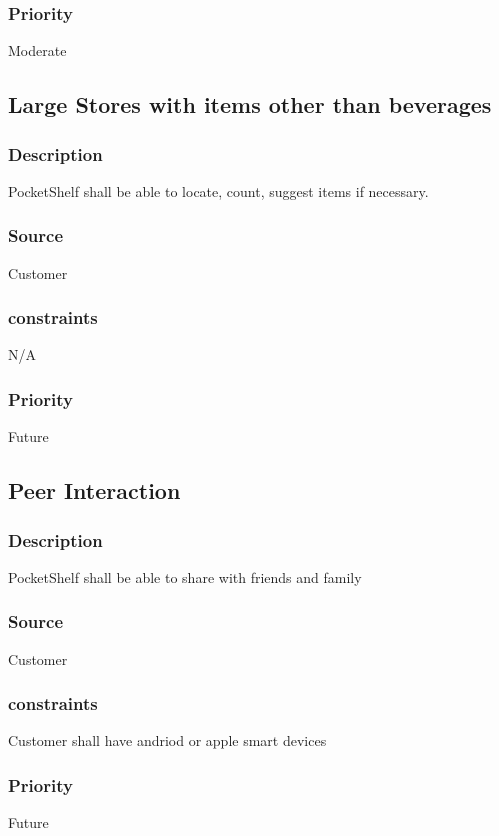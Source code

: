 \subsubsection{Priority}
Moderate
\\
\subsection{Large Stores with items other than beverages}
\subsubsection{Description}
PocketShelf shall be able to locate, count, suggest items if necessary.
\subsubsection{Source}
Customer
\subsubsection{constraints}
 N/A
\subsubsection{Priority}
Future

\subsection{Peer Interaction}
\subsubsection{Description}
PocketShelf shall be able to share with friends and family
\subsubsection{Source}
Customer
\subsubsection{constraints}
 Customer shall have andriod or apple smart devices
\subsubsection{Priority}
Future